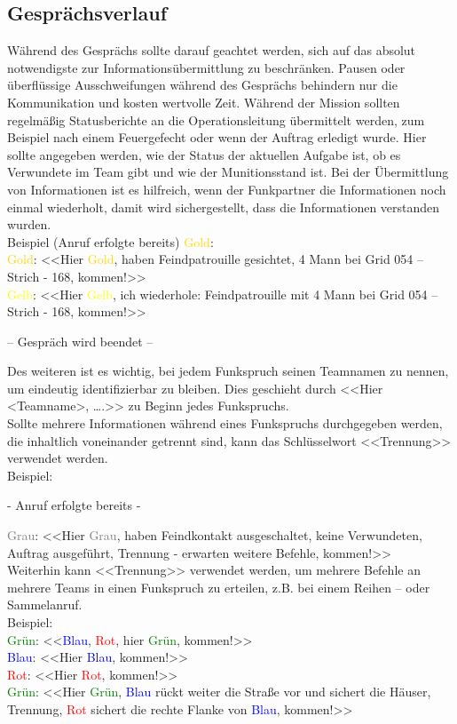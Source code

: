 \subsection{Gesprächsverlauf}
Während des Gesprächs sollte darauf geachtet werden, sich auf das absolut notwendigste zur Informationsübermittlung zu beschränken. Pausen oder überflüssige Ausschweifungen während des Gesprächs behindern nur die Kommunikation und kosten wertvolle Zeit. Während der Mission sollten regelmäßig Statusberichte an die Operationsleitung übermittelt werden, zum Beispiel nach einem Feuergefecht oder wenn der Auftrag erledigt wurde. Hier sollte angegeben werden, wie der Status der aktuellen Aufgabe ist, ob es Verwundete im Team gibt und wie der Munitionsstand ist. Bei der Übermittlung von Informationen ist es hilfreich, wenn der Funkpartner die Informationen noch einmal wiederholt, damit wird sichergestellt, dass die Informationen
verstanden wurden. \\
Beispiel (Anruf erfolgte bereits) \textcolor{gold}{Gold}: \\
\textcolor{gold}{Gold}: <<Hier \textcolor{gold}{Gold}, haben Feindpatrouille gesichtet, 4 Mann bei Grid 054 –Strich - 168, kommen!>> \\
\textcolor{yellow}{Gelb}: <<Hier \textcolor{yellow}{Gelb}, ich wiederhole: Feindpatrouille mit 4 Mann bei Grid 054 – Strich - 168, kommen!>> \\
\begin{center}
– Gespräch wird beendet –
\end{center}
Des weiteren ist es wichtig, bei jedem Funkspruch seinen Teamnamen zu nennen, um eindeutig identifizierbar zu bleiben. Dies geschieht durch <<Hier <Teamname>, ….>> zu Beginn jedes Funkspruchs. \\
Sollte mehrere Informationen während eines Funkspruchs durchgegeben werden, die inhaltlich voneinander getrennt sind, kann das Schlüsselwort <<Trennung>> verwendet werden. \\
Beispiel: \\
\begin{center}
- Anruf erfolgte bereits -
\end{center}
\textcolor{gray}{Grau}: <<Hier \textcolor{gray}{Grau}, haben Feindkontakt ausgeschaltet, keine Verwundeten, Auftrag ausgeführt, Trennung - erwarten weitere Befehle, kommen!>> \\
Weiterhin kann <<Trennung>> verwendet werden, um mehrere Befehle an mehrere Teams in einen Funkspruch zu erteilen, z.B. bei einem Reihen – oder Sammelanruf. \\
Beispiel: \\
\textcolor{green}{Grün}: <<\textcolor{blue}{Blau}, \textcolor{red}{Rot}, hier \textcolor{green}{Grün}, kommen!>> \\
\textcolor{blue}{Blau}: <<Hier \textcolor{blue}{Blau}, kommen!>> \\
\textcolor{red}{Rot}: <<Hier \textcolor{red}{Rot}, kommen!>> \\
\textcolor{green}{Grün}: <<Hier \textcolor{green}{Grün}, \textcolor{blue}{Blau} rückt weiter die Straße vor und sichert die Häuser, Trennung, \textcolor{red}{Rot} sichert die rechte Flanke von \textcolor{blue}{Blau}, kommen!>> \\


